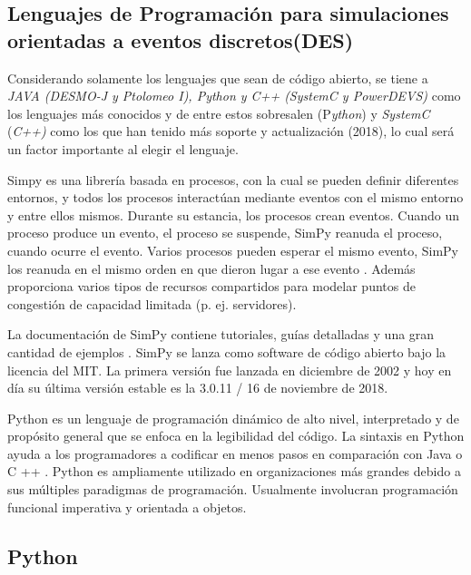\subsection{Lenguajes de Programación para simulaciones orientadas a eventos discretos(DES)}

Considerando solamente los lenguajes que sean de código abierto, se tiene a \textit{JAVA (DESMO-J y Ptolomeo I), Python y C++ (SystemC y PowerDEVS)} como los lenguajes más conocidos y de entre estos sobresalen (P\textit{ython}) y \textit{SystemC }(\textit{C++) }como los que han tenido más soporte y actualización (2018), lo cual será un factor importante al elegir el lenguaje.\newline

Simpy es una librería basada en procesos, con la cual se pueden definir diferentes entornos, y todos los procesos interactúan mediante eventos con el mismo entorno y entre ellos mismos. Durante su estancia, los procesos crean eventos. Cuando un proceso produce un evento, el proceso se suspende, SimPy reanuda el proceso, cuando ocurre el evento. Varios procesos pueden esperar el mismo evento, SimPy los reanuda en el mismo orden en que dieron lugar a ese evento \parencite{Simpy}. Además proporciona varios tipos de recursos compartidos para modelar puntos de congestión de capacidad limitada (p. ej. servidores).\newline

La documentación de SimPy contiene tutoriales, guías detalladas y una gran cantidad de ejemplos \parencite{Simpy}. SimPy se lanza como software de código abierto bajo la licencia del MIT. La primera versión fue lanzada en diciembre de 2002 y hoy en día su última versión estable es la 3.0.11 / 16 de noviembre de 2018.\newline

Python es un lenguaje de programación dinámico de alto nivel, interpretado y de propósito general que se enfoca en la legibilidad del código. La sintaxis en Python ayuda a los programadores a codificar en menos pasos en comparación con Java o C ++ \parencite{PythonVentajas}. Python es ampliamente utilizado en organizaciones más grandes debido a sus múltiples paradigmas de programación. Usualmente involucran programación funcional imperativa y orientada a objetos. 

\subsection{Python}

